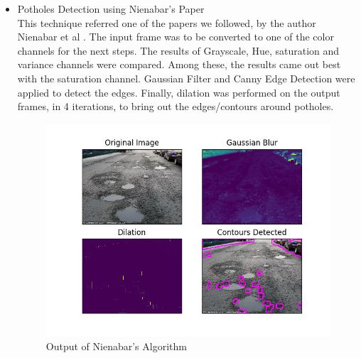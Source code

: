 \documentclass[12pt,a4paper]{article}
\begin{document}
\begin{itemize}
\item Potholes Detection using Nienabar's Paper \\

This technique referred one of the papers we followed, by the author Nienabar et al \cite{paperone}. The input frame was to be converted to one of the color channels for the next steps. The results of Grayscale, Hue, saturation and variance channels were compared. Among these, the results came out best with the saturation channel. Gaussian Filter and Canny Edge Detection were applied to detect the edges. Finally, dilation was performed on the output frames, in 4 iterations, to bring out the edges/contours around potholes.


    \begin{figure}[ht!]
        \centering
        \includegraphics[width = 5in]{images/nienabar_2.png}
        \caption{Output of Nienabar's Algorithm}
    \end{figure}
    

    

\end{itemize}
\end{document}
